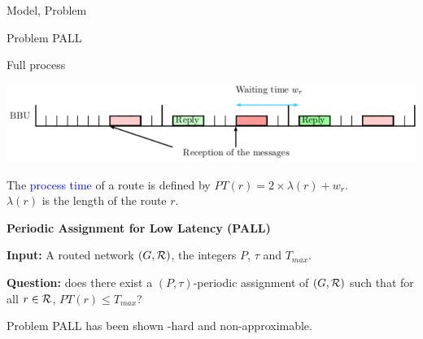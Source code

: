 \documentclass[10 pt]{beamer}
\begin{document}
\begin{section}{Model, Problem}
\begin{subsection}{Problem PALL}
\begin{frame}{Full process}
\begin{center}
  \includegraphics[scale=0.7]{BBU}\\
 \end{center} 
 The \textcolor{blue}{process time} of a route is defined by $PT(r)=2\times\lambda(r)+ w_r$.\\
 
 $\lambda(r)$ is the length of the route $r$.
 
 \vspace{0.5cm}
 \pause
      {\bf Periodic Assignment for Low Latency (PALL)} 

      {\bf Input:}  A routed network $(G,{\cal R})$, the integers $P$, $\tau$ and $T_{max}$.

      {\bf Question:} does there exist a $(P,\tau)$-periodic assignment of $(G,{\cal R})$ such that for all $r \in {\cal R}$, $PT(r) \leq T_{max}$?
      \vspace{0.5cm}
      
      Problem PALL has been shown \NP-hard and non-approximable.
\end {frame}
\end{subsection}


\end{section}
\end{document}
